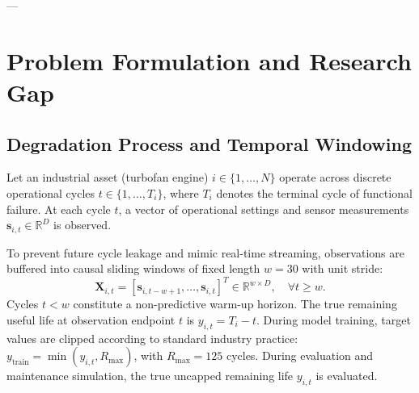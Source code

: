 \documentclass[conference]{IEEEtran}
\begin{document}
---

\section{Problem Formulation and Research Gap}

\subsection{Degradation Process and Temporal Windowing}
Let an industrial asset (turbofan engine) $i \in \{1, \dots, N\}$ operate across discrete operational cycles $t \in \{1, \dots, T_i\}$, where $T_i$ denotes the terminal cycle of functional failure. At each cycle $t$, a vector of operational settings and sensor measurements $\mathbf{s}_{i,t} \in \mathbb{R}^{D}$ is observed. 

To prevent future cycle leakage and mimic real-time streaming, observations are buffered into causal sliding windows of fixed length $w=30$ with unit stride:
\begin{equation}
\mathbf{X}_{i,t} = [\mathbf{s}_{i,t-w+1}, \dots, \mathbf{s}_{i,t}]^T \in \mathbb{R}^{w \times D}, \quad \forall t \ge w.
\end{equation}
Cycles $t < w$ constitute a non-predictive warm-up horizon. The true remaining useful life at observation endpoint $t$ is $y_{i,t} = T_i - t$. During model training, target values are clipped according to standard industry practice: $y_{\text{train}} = \min(y_{i,t}, R_{\text{max}})$, with $R_{\text{max}} = 125$ cycles. During evaluation and maintenance simulation, the true uncapped remaining life $y_{i,t}$ is evaluated.
\end{document}
